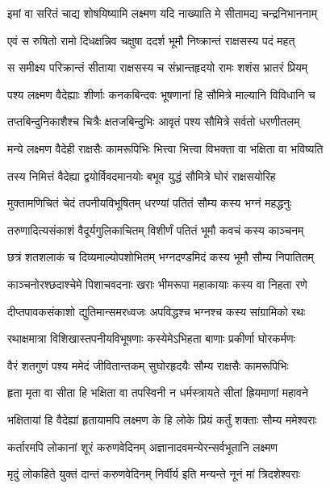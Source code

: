 \twolineshloka
{इमां वा सरितं चाद्य शोषयिष्यामि लक्ष्मण}
{यदि नाख्याति मे सीतामद्य चन्द्रनिभाननाम्} %

\twolineshloka
{एवं स रुषितो रामो दिधक्षन्निव चक्षुषा}
{ददर्श भूमौ निष्क्रान्तं राक्षसस्य पदं महत्} %

\twolineshloka
{स समीक्ष्य परिक्रान्तं सीताया राक्षसस्य च}
{संभ्रान्तहृदयो रामः शशंस भ्रातरं प्रियम्} %

\twolineshloka
{पश्य लक्ष्मण वैदेह्याः शीर्णाः कनकबिन्दवः}
{भूषणानां हि सौमित्रे माल्यानि विविधानि च} %

\twolineshloka
{तप्तबिन्दुनिकाशैश्च चित्रैः क्षतजबिन्दुभिः}
{आवृतं पश्य सौमित्रे सर्वतो धरणीतलम्} %

\twolineshloka
{मन्ये लक्ष्मण वैदेही राक्षसैः कामरूपिभिः}
{भित्त्वा भित्त्वा विभक्ता वा भक्षिता वा भविष्यति} %

\twolineshloka
{तस्य निमित्तं वैदेह्या द्वयोर्विवदमानयोः}
{बभूव युद्धं सौमित्रे घोरं राक्षसयोरिह} %

\twolineshloka
{मुक्तामणिचितं चेदं तपनीयविभूषितम्}
{धरण्यां पतितं सौम्य कस्य भग्नं महद्धनुः} %

\twolineshloka
{तरुणादित्यसंकाशं वैदूर्यगुलिकाचितम्}
{विशीर्णं पतितं भूमौ कवचं कस्य काञ्चनम्} %

\twolineshloka
{छत्रं शतशलाकं च दिव्यमाल्योपशोभितम्}
{भग्नदण्डमिदं कस्य भूमौ सौम्य निपातितम्} %

\twolineshloka
{काञ्चनोरश्छदाश्चेमे पिशाचवदनाः खराः}
{भीमरूपा महाकायाः कस्य वा निहता रणे} %

\twolineshloka
{दीप्तपावकसंकाशो द्युतिमान्समरध्वजः}
{अपविद्धश्च भग्नश्च कस्य सांग्रामिको रथः} %

\twolineshloka
{रथाक्षमात्रा विशिखास्तपनीयविभूषणाः}
{कस्येमेऽभिहता बाणाः प्रकीर्णा घोरकर्मणः} %

\twolineshloka
{वैरं शतगुणं पश्य ममेदं जीवितान्तकम्}
{सुघोरहृदयैः सौम्य राक्षसैः कामरूपिभिः} %

\twolineshloka
{हृता मृता वा सीता हि भक्षिता वा तपस्विनी}
{न धर्मस्त्रायते सीतां ह्रियमाणां महावने} %

\twolineshloka
{भक्षितायां हि वैदेह्यां हृतायामपि लक्ष्मण}
{के हि लोके प्रियं कर्तुं शक्ताः सौम्य ममेश्वराः} %

\twolineshloka
{कर्तारमपि लोकानां शूरं करुणवेदिनम्}
{अज्ञानादवमन्येरन्सर्वभूतानि लक्ष्मण} %

\twolineshloka
{मृदुं लोकहिते युक्तं दान्तं करुणवेदिनम्}
{निर्वीर्य इति मन्यन्ते नूनं मां त्रिदशेश्वराः} %

